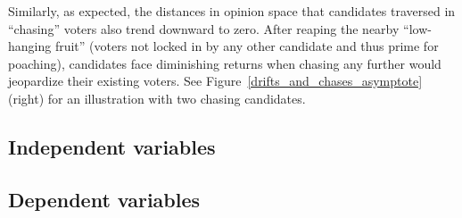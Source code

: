Similarly, as expected, the distances in opinion space that candidates
traversed in ``chasing'' voters also trend downward to zero. After reaping the
nearby ``low-hanging fruit'' (voters not locked in by any other candidate and
thus prime for poaching), candidates face diminishing returns when chasing any
further would jeopardize their existing voters. See
Figure~\ref{drifts_and_chases_asymptote} (right) for an illustration with two
chasing candidates.


\subsection{Independent variables}

%
%
%
%
%    


\subsection{Dependent variables}

